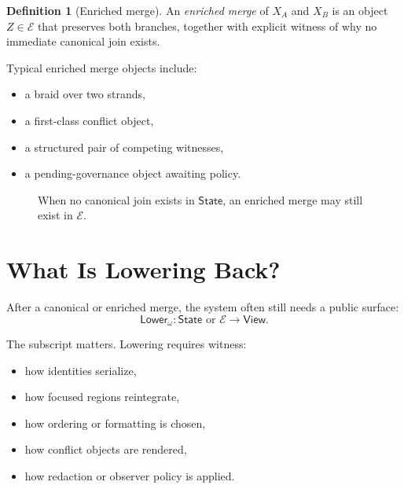 \documentclass[11pt]{article}
\newcommand{\State}{\ensuremath{\mathsf{State}}}
\newcommand{\View}{\ensuremath{\mathsf{View}}}
\newcommand{\Lower}{\ensuremath{\mathsf{Lower}}}
\newcommand{\Enriched}{\ensuremath{\mathcal{E}}}
\theoremstyle{definition}
\newtheorem{definition}{Definition}
\begin{document}
\begin{definition}[Enriched merge]
An \emph{enriched merge} of $X_A$ and $X_B$ is an object $Z \in \Enriched$ that
preserves both branches, together with explicit witness of why no immediate
canonical join exists.
\end{definition}

Typical enriched merge objects include:
\begin{itemize}[leftmargin=2em]
\item a braid over two strands,
\item a first-class conflict object,
\item a structured pair of competing witnesses,
\item a pending-governance object awaiting policy.
\end{itemize}

\begin{figure}[h]
\centering
{}
\caption{When no canonical join exists in $\State$, an enriched merge may still exist in $\Enriched$.}
\end{figure}

\section{What Is Lowering Back?}

After a canonical or enriched merge, the system often still needs a public
surface:
\[
\Lower_\omega : \State \text{ or } \Enriched \to \View.
\]

The subscript matters. Lowering requires witness:
\begin{itemize}[leftmargin=2em]
\item how identities serialize,
\item how focused regions reintegrate,
\item how ordering or formatting is chosen,
\item how conflict objects are rendered,
\item how redaction or observer policy is applied.
\end{itemize}
\end{document}
